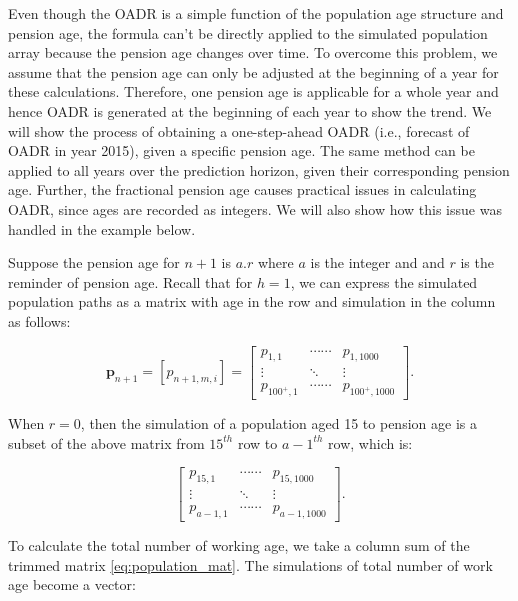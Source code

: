 \documentclass[11pt,a4paper,]{article}
\begin{document}
Even though the OADR is a simple function of the population age
structure and pension age, the formula can't be directly applied to the
simulated population array because the pension age changes over time. To
overcome this problem, we assume that the pension age can only be
adjusted at the beginning of a year for these calculations. Therefore,
one pension age is applicable for a whole year and hence OADR is
generated at the beginning of each year to show the trend. We will show
the process of obtaining a one-step-ahead OADR (i.e., forecast of OADR
in year 2015), given a specific pension age. The same method can be
applied to all years over the prediction horizon, given their
corresponding pension age. Further, the fractional pension age causes
practical issues in calculating OADR, since ages are recorded as
integers. We will also show how this issue was handled in the example
below.

Suppose the pension age for \(n+1\) is \(a.r\) where \(a\) is the
integer and and \(r\) is the reminder of pension age. Recall that for
\(h=1\), we can express the simulated population paths as a matrix with
age in the row and simulation in the column as follows:

\begin{equation*}
  \bm{p}_{n+1}=[p_{n+1,m,i}] =
    \begin{bmatrix}
       p_{1,1} & \cdots\cdots & p_{1,1000} \\
      \vdots & \ddots & \vdots \\
      p_{100^+,1} & \cdots\cdots &p_{100^+,1000}
      \end{bmatrix}.
\end{equation*}

When \(r=0\), then the simulation of a population aged 15 to pension age
is a subset of the above matrix from \(15^{th}\) row to \(a-1^{th}\)
row, which is:

\begin{equation}
  \begin{bmatrix}
    p_{15,1} & \cdots\cdots & p_{15,1000} \\
    \vdots & \ddots & \vdots \\
    p_{a-1,1} & \cdots\cdots &p_{a-1,1000}
  \end{bmatrix}. \label{eq:population_mat}
\end{equation}

To calculate the total number of working age, we take a column sum of
the trimmed matrix \eqref{eq:population_mat}. The simulations of total
number of work age become a vector:
\end{document}
